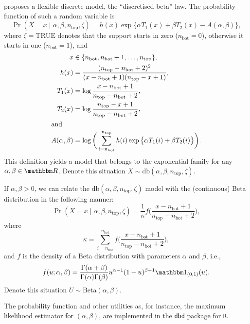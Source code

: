 \documentclass[12pt]{article}
\begin{document}
\citet{ANewVersatileDiscreteDistribution} proposes a flexible discrete model, the ``discretised beta'' law.
The probability function of such a random variable is
\begin{equation}
\Pr(X  = x \mid \alpha, \beta, n_{\text{top}}, \zeta) = h(x) \exp\big\{ \alpha T_1(x) + \beta T_2(x) - A(\alpha, \beta) \big\},
\label{Eq:ProbdbExponential}
\end{equation}
where $\zeta=\text{TRUE}$ denotes that the support starts in zero ($n_{\text{bot}}=0$), otherwise it starts in one ($n_{\text{bot}}=1$), and
\begin{align}
x &\in \{n_{\text{bot}}, n_{\text{bot}}+1, \dots, n_{\text{top}}\},\\
h(x) & =\frac{(n_{\text{top}} - n_{\text{bot}}+2)^2}{
(x-n_{\text{bot}}+1)	(n_{\text{top}}-x+1)	},\\
T_1(x) &= \log\frac{x-n_{\text{bot}}+1}{n_{\text{top}}-n_{\text{bot}}+2}, \\
T_2(x) &= \log\frac{n_{\text{top}}-x+1}{n_{\text{top}}-n_{\text{bot}}+2}, \\
\intertext{and}
A(\alpha,\beta) &= \log \bigg(
\sum_{i=n_{\text{bot}}}^{n_{\text{top}}} h(i) \exp\big\{ \alpha T_1(i) + \beta T_2(i)\big\}
\bigg).
\end{align}
This definition yields a model that belongs to the exponential family for any $\alpha,\beta\in\mathbbm R$.
Denote this situation $X\sim\text{db}(\alpha,\beta, n_{\text{top}},\zeta)$.

If $\alpha,\beta>0$, we can relate the $\text{db}(\alpha,\beta, n_{\text{top}},\zeta)$ model with the (continuous) Beta distribution in the following manner:
\begin{equation}
\Pr(X=x \mid \alpha, \beta, n_{\text{top}}, \zeta) = 
\frac{1}{\kappa} f\Big(
\frac{x-n_{\text{bot}}+1}{n_{\text{top}}-n_{\text{bot}}+2}
\Big),
\label{Eq:Probdb}
\end{equation}
where
$$
\kappa = \sum_{i=n_{\text{bot}}}^{n_{\text{bot}}} f\Big(
\frac{x-n_{\text{bot}}+1}{n_{\text{top}}-n_{\text{bot}}+2}
\Big),
$$
and $f$ is the density of a Beta distribution with parameters $\alpha$ and $\beta$, i.e.,
\begin{equation}
	f(u;\alpha, \beta) = \frac{\Gamma(\alpha+\beta)}{\Gamma(\alpha)\Gamma(\beta)} u^{\alpha-1} (1-u)^{\beta-1} \mathbbm 1_{(0,1)}(u).
	\label{Eq:DensBeta}
\end{equation}
Denote this situation $U\sim\text{Beta}(\alpha,\beta)$.

The probability function and other utilities as, for instance, the maximum likelihood estimator for $(\alpha,\beta)$, are implemented in the \texttt{dbd} package for \texttt{R}.
\end{document}

